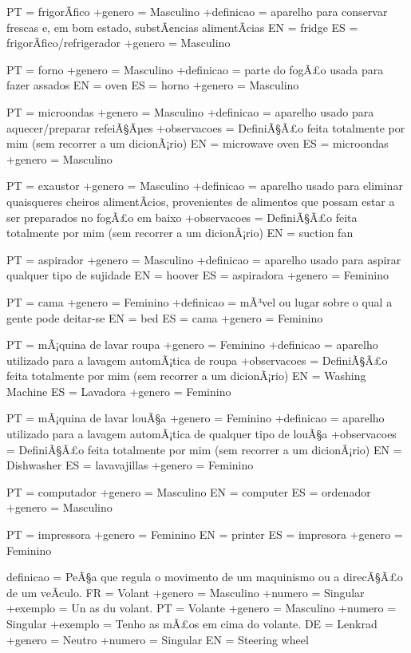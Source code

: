 \documentclass[a4paper]{article}
\begin{document}
PT = frigorÃ\-fico
+genero = Masculino
+definicao = aparelho para conservar frescas e, em bom estado, substÃ¢ncias alimentÃ\-cias
EN = fridge
ES = frigorÃ\-fico/refrigerador
+genero = Masculino

PT = forno
+genero = Masculino
+definicao = parte do fogÃ£o usada para fazer assados
EN = oven
ES = horno
+genero = Masculino

PT = microondas
+genero = Masculino
+definicao = aparelho usado para aquecer/preparar refeiÃ§Ãµes
+observacoes = DefiniÃ§Ã£o feita totalmente por mim (sem recorrer a um dicionÃ¡rio)
EN = microwave oven
ES = microondas
+genero = Masculino

PT = exaustor
+genero = Masculino
+definicao = aparelho usado para eliminar quaisqueres cheiros alimentÃ\-cios, provenientes de alimentos que possam estar a ser preparados no fogÃ£o em baixo
+observacoes = DefiniÃ§Ã£o feita totalmente por mim (sem recorrer a um dicionÃ¡rio)
EN = suction fan

PT = aspirador
+genero = Masculino
+definicao = aparelho usado para aspirar qualquer tipo de sujidade
EN = hoover
ES = aspiradora
+genero = Feminino

PT = cama
+genero = Feminino
+definicao = mÃ³vel ou lugar sobre o qual a gente pode deitar-se
EN = bed
ES = cama
+genero = Feminino

PT = mÃ¡quina de lavar roupa
+genero = Feminino
+definicao = aparelho utilizado para a lavagem automÃ¡tica de roupa
+observacoes = DefiniÃ§Ã£o feita totalmente por mim (sem recorrer a um dicionÃ¡rio)
EN = Washing Machine
ES = Lavadora
+genero = Feminino

PT = mÃ¡quina de lavar louÃ§a
+genero = Feminino
+definicao = aparelho utilizado para a lavagem automÃ¡tica de qualquer tipo de louÃ§a
+observacoes = DefiniÃ§Ã£o feita totalmente por mim (sem recorrer a um dicionÃ¡rio)
EN = Dishwasher
ES = lavavajillas
+genero = Feminino

PT = computador
+genero = Masculino
EN = computer
ES = ordenador
+genero = Masculino

PT = impressora
+genero = Feminino
EN = printer
ES = impresora
+genero = Feminino

definicao = PeÃ§a que regula o movimento de um maquinismo ou a direcÃ§Ã£o de um veÃ\-culo.
FR = Volant
+genero = Masculino
+numero = Singular
+exemplo = Un as du volant.
PT = Volante
+genero = Masculino
+numero = Singular
+exemplo = Tenho as mÃ£os em cima do volante.
DE = Lenkrad
+genero = Neutro
+numero = Singular
EN = Steering wheel
\end{document}

